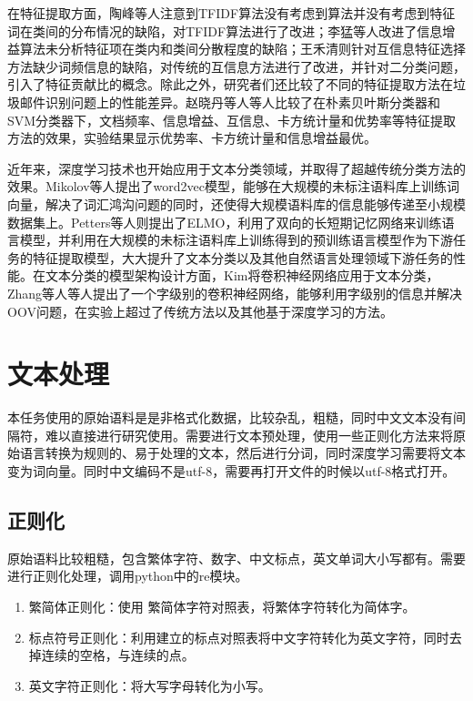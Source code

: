 \documentclass[a4paper]{article}
\begin{document}
在特征提取方面，陶峰等人\cite{tf_tfidf}注意到TFIDF算法没有考虑到算法并没有考虑到特征词在类间的分布情况的缺陷，对TFIDF算法进行了改进；李猛等人\cite{lm_ig}改进了信息增益算法未分析特征项在类内和类间分散程度的缺陷；王禾清\cite{whq_mi}则针对互信息特征选择方法缺少词频信息的缺陷，对传统的互信息方法进行了改进，并针对二分类问题，引入了特征贡献比的概念。除此之外，研究者们还比较了不同的特征提取方法在垃圾邮件识别问题上的性能差异。赵晓丹等人\cite{zxd}等人比较了在朴素贝叶斯分类器和SVM分类器下，文档频率、信息增益、互信息、卡方统计量和优势率等特征提取方法的效果，实验结果显示优势率、卡方统计量和信息增益最优。

近年来，深度学习技术也开始应用于文本分类领域，并取得了超越传统分类方法的效果。Mikolov等人\cite{mikolov2013distributed}提出了word2vec模型，能够在大规模的未标注语料库上训练词向量，解决了词汇鸿沟问题的同时，还使得大规模语料库的信息能够传递至小规模数据集上。Petters等人\cite{peters2018deep}则提出了ELMO，利用了双向的长短期记忆网络来训练语言模型，并利用在大规模的未标注语料库上训练得到的预训练语言模型作为下游任务的特征提取模型，大大提升了文本分类以及其他自然语言处理领域下游任务的性能。在文本分类的模型架构设计方面，Kim\cite{kim2014convolutional}将卷积神经网络应用于文本分类，Zhang等人\cite{zhang2015character}等人提出了一个字级别的卷积神经网络，能够利用字级别的信息并解决OOV问题，在实验上超过了传统方法以及其他基于深度学习的方法。

\section{文本处理}

本任务使用的原始语料是是非格式化数据，比较杂乱，粗糙，同时中文文本没有间隔符，难以直接进行研究使用。需要进行文本预处理，使用一些正则化方法来将原始语言转换为规则的、易于处理的文本，然后进行分词，同时深度学习需要将文本变为词向量\cite{周钦强2005文本自动分类系统文本预处理方法的研究}。同时中文编码不是utf-8，需要再打开文件的时候以utf-8格式打开。
\subsection{正则化}
原始语料比较粗糙，包含繁体字符、数字、中文标点，英文单词大小写都有。需要进行正则化处理，调用python中的re模块。
\begin{enumerate}
	\item 繁简体正则化：使用 繁简体字符对照表，将繁体字符转化为简体字。
	\item 标点符号正则化：利用建立的标点对照表将中文字符转化为英文字符，同时去掉连续的空格，与连续的点。
	\item 英文字符正则化：将大写字母转化为小写。
\end{enumerate}
\end{document}
